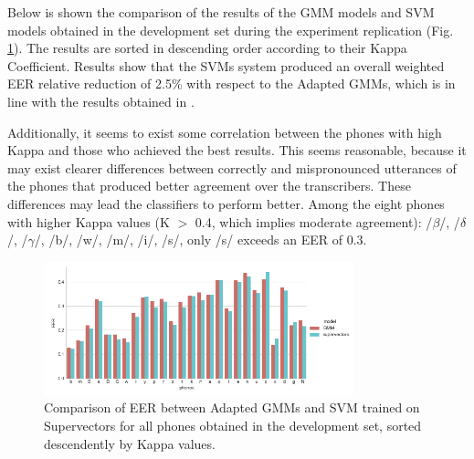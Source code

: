 


Below is shown the
comparison of the results of the GMM models and
SVM models obtained in the development set during the experiment
replication (Fig. \ref{fig:gmmSupervectorsDev}).
The results are sorted in descending order according to their Kappa Coefficient.
Results show that the SVMs system produced an overall weighted EER relative reduction of 2.5\% with
respect to the Adapted GMMs, which is in line with the results obtained
in \cite{main}.

Additionally, it seems to exist some correlation between the phones with high Kappa
and those who achieved
the best results. This seems reasonable, because it may exist clearer differences
between correctly and mispronounced
utterances of the phones that produced better agreement over the transcribers.
These differences may lead the classifiers to perform better.
Among the eight phones with higher Kappa values (K $>$ 0.4, which implies moderate agreement):
/$\beta$/, /$\delta$/, /$\gamma$/, /b/, /w/, /m/, /i/, /s/, only /s/ exceeds an EER of 0.3.

\begin{figure}[H]
	\centering
	\includegraphics[width=0.8\textwidth]{files/figures/results/gmm-vs-supervectors/gmm-vs-supervectors-dev.png}
	\caption{Comparison of EER between Adapted GMMs
	and SVM trained on Supervectors for all phones obtained in the development set, sorted
	descendently by Kappa values.}
	\label{fig:gmmSupervectorsDev}
\end{figure}


